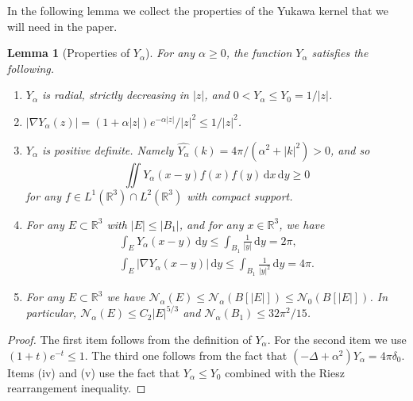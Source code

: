 \documentclass[a4paper,11pt,reqno]{amsart}
\numberwithin{equation}{section}
\newtheorem{lemma}[theorem]{Lemma}
\theoremstyle{remark}
\theoremstyle{definition}
\newcommand{\R}{\mathbb R}
\newcommand{\dd}{\,\mathrm{d}}
\newcommand{\nl}{\mathcal{N}_{\alpha}}
\newcommand{\trns}[1]{\widehat{#1}\,}
\renewcommand{\leq}{\leqslant}
\renewcommand{\geq}{\geqslant}
\newcommand{\calN}{\mathcal{N}}
\begin{document}
In the following lemma we collect the properties of the Yukawa kernel that we will need in the paper.
	\begin{lemma}[Properties of $Y_\alpha$]\label{lem:kernel_prop}
		For any $\alpha\geq 0$, the function $Y_\alpha$ satisfies the following.
			\begin{enumerate}
            \item $Y_\alpha$ is radial, strictly decreasing in $|z|$, and $0<Y_\alpha \leq Y_0=1/|z|$.
            \item $|\nabla Y_\alpha(z)|=(1+\alpha|z|)e^{-\alpha|z|}/|z|^2\leq 1/|z|^2$.
            \item $Y_\alpha$ is positive definite. Namely $\trns{Y_\alpha}(k)=4\pi/(\alpha^2+|k|^2)>0$, and so
            	\[
            		\iint Y_\alpha(x-y)f(x)f(y)\dd x \dd y \geq 0
            	\]
            for any $f\in L^1(\R^3)\cap L^2(\R^3)$ with compact support.
            \item For any $E\subset \R^3$ with $|E|\leq |B_1|$, and for any $x\in\R^3$, we have
            	\begin{gather*}
            		\int_E Y_\alpha(x-y)\dd y \leq \int_{B_1} \frac{1}{|y|}\dd y = 2\pi,\\
            		\int_E |\nabla Y_\alpha(x-y)|\dd y \leq \int_{B_1} \frac{1}{|y|^2} \dd y = 4\pi.
            	\end{gather*}
            \item For any $E\subset \mathbb{R}^3$ we have $\nl(E) \leq \nl(B[|E|]) \leq \calN_0(B[|E|])$. In particular, $\nl(E) \leq C_2 |E|^{5/3}$ and $\nl(B_1) \leq 32\pi^2/15$. 
        \end{enumerate}
	\end{lemma}
	
\begin{proof}
The first item follows from the definition of $Y_\alpha$. For the second item we use $(1+t)e^{-t}\leq 1$. The third one follows from the fact that $(-\Delta+\alpha^2)Y_\alpha=4\pi\delta_0$. Items (iv) and (v) use the fact that $Y_\alpha \leq Y_0$ combined with the Riesz rearrangement inequality.
\end{proof}
\end{document}
